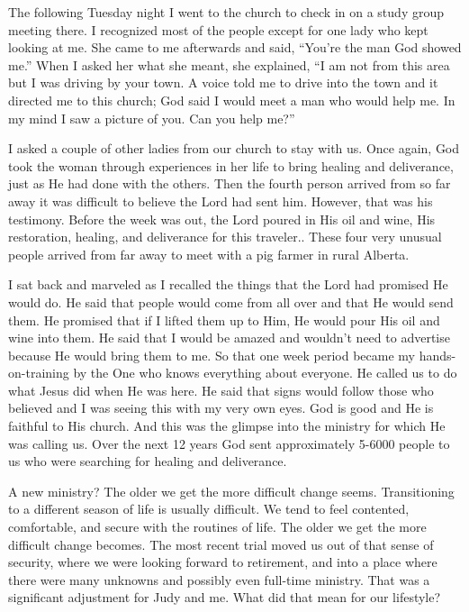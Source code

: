 \documentclass[twoside, 12pt]{book}
\begin{document}
The following Tuesday night I went to the church to check in on a study group meeting there. I recognized most of the people except for one lady who kept looking at me. She came to me afterwards and said, “You're the man God showed me.” When I asked her what she meant, she explained, “I am not from this area but I was driving by your town. A voice told me to drive into the town and it directed me to this church; God said I would meet a man who would help me. In my mind I saw a picture of you. Can you help me?”

I asked a couple of other ladies from our church to stay with us. Once again, God took the woman through experiences in her life to bring healing and deliverance, just as He had done with the others.
Then the fourth person arrived from so far away it was difficult to believe the Lord had sent him. However, that was his testimony. Before the week was out, the Lord poured in His oil and wine, His restoration, healing, and deliverance for this traveler.. These four very unusual people arrived from far away to meet with a pig farmer in rural Alberta.

I sat back and marveled as I recalled the things that the Lord had promised He would do. He said that people would come from all over and that He would send them. He promised that if I lifted them up to Him, He would pour His oil and wine into them. He said that I would be amazed and wouldn’t need to advertise because He would bring them to me. So that one week period became my hands-on-training by the One who knows everything about everyone. He called us to do what Jesus did when He was here. He said that signs would follow those who believed and I was seeing this with my very own eyes. God is good and He is faithful to His church. And this was the glimpse into the ministry for which He was calling us. Over the next 12 years God sent approximately 5-6000 people to us who were searching for healing and deliverance. 

A new ministry? The older we get the more difficult change seems. Transitioning to a different season of life is usually difficult. We tend to feel contented, comfortable, and secure with the routines of life. The older we get the more difficult change becomes. The most recent trial moved us out of that sense of security, where we were looking forward to retirement, and into a place where there were many unknowns and possibly even full-time ministry. That was a significant adjustment for Judy and me. What did that mean for our lifestyle?
\end{document}
